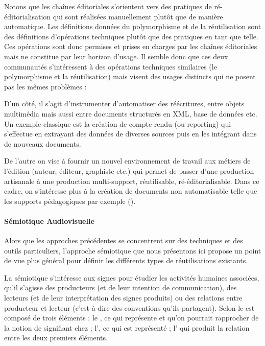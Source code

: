 Notons que les chaînes éditoriales s'orientent vers des pratiques de ré-éditorialisation qui sont réalisées manuellement plutôt que de manière automatique.
Les définitions données du polymorphisme et de la réutilisation sont des définitions d'opérations techniques plutôt que des pratiques en tant que telle. 
Ces opérations sont donc permises et prises en charges par les chaînes éditoriales mais ne constitue par leur horizon d'usage.
Il semble donc que ces deux communautés s'intéressent à des opérations techniques similaires (le polymorphisme et la réutilisation) mais visent des usages distincts qui ne posent pas les mêmes problèmes :
\begin{liste}
	\item D'un côté, il s'agit d'instrumenter d'automatiser des réécritures, entre objets multimédia mais aussi entre documents structurés en XML, base de données etc. 
	Un exemple classique est la création de compte-rendu (ou reporting) qui s'effectue en extrayant des données de diverses sources puis en les intégrant dans de nouveaux documents.

	\item De l'autre on vise à fournir un nouvel environnement de travail aux métiers de l'édition (auteur, éditeur, graphiste etc.) qui permet de passer d'une production artisanale à une production multi-support, réutilisable, ré-éditorialisable. 
	Dans ce cadre, on s'intéresse plus à la création de documents non automatisable telle que les supports pédagogiques par exemple (\cite{Crozat2007}).\\
\end{liste}


\paragraph{Sémiotique Audiovisuelle}
Alors que les approches précédentes se concentrent sur des techniques et des outils particuliers, l'approche sémiotique que nous présentons ici propose un point de vue plus général pour définir les différents types de réutilisations existants. 

La sémiotique s'intéresse aux signes pour étudier les activités humaines associées, qu'il s'agisse des producteurs (et de leur intention de communication), des lecteurs (et de leur interprétation des signes produits) ou des relations entre producteur et lecteur (c'est-à-dire des conventions qu'ils partagent). 
Selon \cite{Peirce1978} le  est composé de trois éléments ; le , ce qui représente et qu'on pourrait rapprocher de la notion de signifiant chez \cite{DeSaussure1995} ; l', ce qui est représenté ; l' qui produit la relation entre les deux premiers éléments. 

